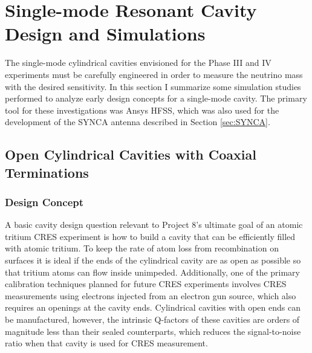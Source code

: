 \section{Single-mode Resonant Cavity Design and Simulations}
\label{sec:chap6-single-mode-cavity-sims}

The single-mode cylindrical cavities envisioned for the Phase III and IV experiments must be carefully engineered in order to measure the neutrino mass with the desired sensitivity. In this section I summarize some simulation studies performed to analyze early design concepts for a single-mode cavity. The primary tool for these investigations was Ansys HFSS, which was also used for the development of the SYNCA antenna described in Section \ref{sec:SYNCA}. 

\subsection{Open Cylindrical Cavities with Coaxial Terminations}

\subsubsection*{Design Concept}

A basic cavity design question relevant to Project 8's ultimate goal of an atomic tritium CRES experiment is how to build a cavity that can be efficiently filled with atomic tritium. To keep the rate of atom loss from recombination on surfaces it is ideal if the ends of the cylindrical cavity are as open as possible so that tritium atoms can flow inside unimpeded. Additionally, one of the primary calibration techniques planned for future CRES experiments involves CRES measurements using electrons injected from an electron gun source, which also requires an openings at the cavity ends. Cylindrical cavities with open ends can be manufactured, however, the intrinsic Q-factors of these cavities are orders of magnitude less than their sealed counterparts, which reduces the signal-to-noise ratio when that cavity is used for CRES measurement.

